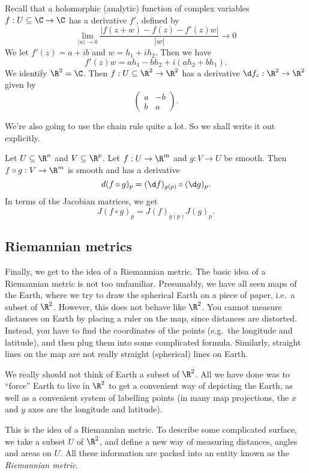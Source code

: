 \documentclass[a4paper]{article}
\begin{document}
\begin{eg}
  Recall that a holomorphic (analytic) function of complex variables $f: U \subseteq \C \to \C$ has a derivative $f'$, defined by
  \[
    \lim_{|w| \to 0} \frac{|f(z + w) - f(z) - f'(z) w|}{|w|} \to 0
  \]
  We let $f'(z) = a + ib$ and $w = h_1 + i h_2$. Then we have
  \[
    f'(z) w = ah_1 - bh_2 + i(ah_2 + bh_1).
  \]
  We identify $\R^2 = \C$. Then $f: U \subseteq \R^2 \to \R^2$ has a derivative $\d f_z: \R^2 \to \R^2$ given by
  \[
    \begin{pmatrix}
      a & -b\\
      b & a
    \end{pmatrix}.
  \]
\end{eg}

We're also going to use the chain rule quite a lot. So we shall write it out explicitly.
\begin{prop}
  Let $U \subseteq \R^n$ and $V\subseteq \R^p$. Let $f: U \to \R^m$ and $g: V \to U$ be smooth. Then $f \circ g: V \to \R^m$ is smooth and has a derivative
  \[
    d(f \circ g)_p = (\d f)_{g(p)} \circ (\d g)_p.
  \]
  In terms of the Jacobian matrices, we get
  \[
    J(f \circ g)_p = J(f)_{g(p)}J(g)_p.
  \]
\end{prop}

\subsection{Riemannian metrics}
Finally, we get to the idea of a Riemannian metric. The basic idea of a Riemannian metric is not too unfamiliar. Presumably, we have all seen maps of the Earth, where we try to draw the spherical Earth on a piece of paper, i.e.\ a subset of $\R^2$. However, this does not behave like $\R^2$. You cannot measure distances on Earth by placing a ruler on the map, since distances are distorted. Instead, you have to find the coordinates of the points (e.g.\ the longitude and latitude), and then plug them into some complicated formula. Similarly, straight lines on the map are not really straight (spherical) lines on Earth.

We really should not think of Earth a subset of $\R^2$. All we have done was to ``force'' Earth to live in $\R^2$ to get a convenient way of depicting the Earth, as well as a convenient system of labelling points (in many map projections, the $x$ and $y$ axes are the longitude and latitude).

This is the idea of a Riemannian metric. To describe some complicated surface, we take a subset $U$ of $\R^2$, and define a new way of measuring distances, angles and areas on $U$. All these information are packed into an entity known as the \emph{Riemannian metric}.
\end{document}
